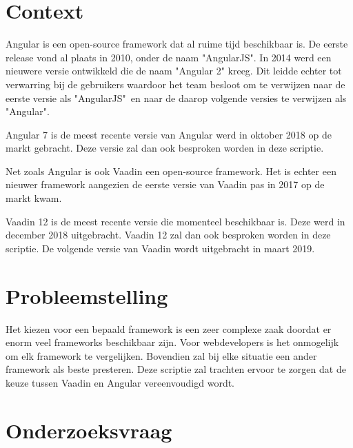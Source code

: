 \section{Context}
\label{sec:context}
Angular is een open-source framework dat al ruime tijd beschikbaar is. De eerste  release vond al plaats in 2010, onder de naam "AngularJS". 
In 2014 werd een nieuwere versie ontwikkeld die de naam "Angular 2" kreeg. Dit leidde echter tot verwarring bij de gebruikers waardoor het team besloot om te verwijzen naar de eerste versie als "AngularJS"\ en naar de daarop volgende versies te verwijzen als "Angular". 

Angular 7 is de meest recente versie van Angular werd in oktober 2018 op de markt gebracht. Deze versie zal dan ook besproken worden in deze scriptie. 

Net zoals Angular is ook Vaadin een open-source framework. Het is echter een nieuwer  framework aangezien de eerste versie van Vaadin pas in 2017 op de markt kwam. 

Vaadin 12 is de meest recente versie die momenteel beschikbaar is. Deze werd in december 2018 uitgebracht. Vaadin 12 zal dan ook besproken worden in deze scriptie. 
De volgende versie van Vaadin wordt uitgebracht in maart 2019.

\section{Probleemstelling}
\label{sec:probleemstelling}
\iffalse
Uit je probleemstelling moet duidelijk zijn dat je onderzoek een meerwaarde heeft voor een concrete doelgroep. De doelgroep moet goed gedefinieerd en afgelijnd zijn. Doelgroepen als ``bedrijven,'' ``KMO's,'' systeembeheerders, enz.~zijn nog te vaag. Als je een lijstje kan maken van de personen/organisaties die een meerwaarde zullen vinden in deze bachelorproef (dit is eigenlijk je steekproefkader), dan is dat een indicatie dat de doelgroep goed gedefinieerd is. Dit kan een enkel bedrijf zijn of zelfs één persoon (je co-promotor/opdrachtgever).
\fi
Het kiezen voor een bepaald framework is een zeer complexe zaak doordat er enorm veel frameworks beschikbaar zijn. Voor webdevelopers is het onmogelijk om elk framework te vergelijken. 
Bovendien zal bij elke situatie een ander framework als beste presteren. 
Deze scriptie zal trachten ervoor te zorgen dat de keuze tussen Vaadin en Angular  vereenvoudigd wordt. 

\section{Onderzoeksvraag}
\label{sec:onderzoeksvraag}
\iffalse
Wees zo concreet mogelijk bij het formuleren van je onderzoeksvraag. Een onderzoeksvraag is trouwens iets waar nog niemand op dit moment een antwoord heeft (voor zover je kan nagaan). Het opzoeken van bestaande informatie (bv. ``welke tools bestaan er voor deze toepassing?'') is dus geen onderzoeksvraag. Je kan de onderzoeksvraag verder specifiëren in deelvragen. Bv.~als je onderzoek gaat over performantiemetingen, dan 
\fi
